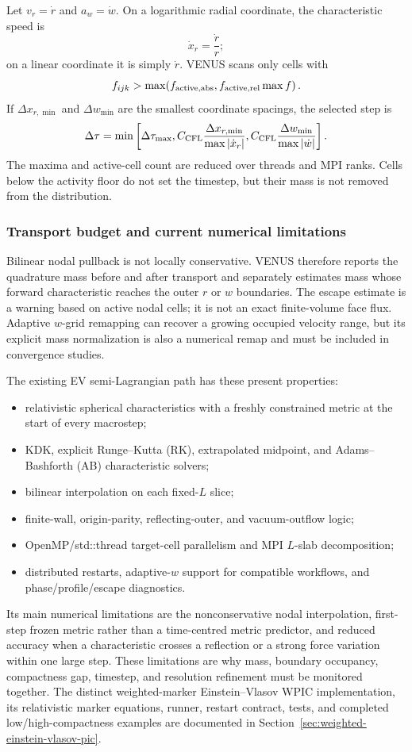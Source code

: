 \documentclass[11pt]{article}
\begin{document}
Let \(v_r=\dot r\) and \(a_w=\dot w\).  On a logarithmic radial coordinate,
the characteristic speed is
\[
 \dot x_r=\frac{\dot r}{r};
\]
on a linear coordinate it is simply \(\dot r\).  VENUS scans only cells with
\[
 f_{ijk}>
 \max\!\left(f_{\rm active,abs},
 f_{\rm active,rel}\max f\right).
\]
If \(\Delta x_{r,\min}\) and \(\Delta w_{\min}\) are the smallest coordinate
spacings, the selected step is
\[
 \Delta\tau=\min\left[
 \Delta\tau_{\max},
 C_{\rm CFL}\frac{\Delta x_{r,\min}}{\max|\dot x_r|},
 C_{\rm CFL}\frac{\Delta w_{\min}}{\max|\dot w|}
 \right].
\]
The maxima and active-cell count are reduced over threads and MPI ranks.
Cells below the activity floor do not set the timestep, but their mass is not
removed from the distribution.

\subsubsection{Transport budget and current numerical limitations}

Bilinear nodal pullback is not locally conservative.  VENUS therefore reports
the quadrature mass before and after transport and separately estimates mass
whose forward characteristic reaches the outer \(r\) or \(w\) boundaries.
The escape estimate is a warning based on active nodal cells; it is not an
exact finite-volume face flux.  Adaptive \(w\)-grid remapping can recover a
growing occupied velocity range, but its explicit mass normalization is also
a numerical remap and must be included in convergence studies.

The existing EV semi-Lagrangian path has these present properties:
\begin{itemize}
\item relativistic spherical characteristics with a freshly constrained metric
at the start of every macrostep;
\item KDK, explicit Runge--Kutta (RK), extrapolated midpoint, and
Adams--Bashforth (AB) characteristic solvers;
\item bilinear interpolation on each fixed-\(L\) slice;
\item finite-wall, origin-parity, reflecting-outer, and vacuum-outflow logic;
\item OpenMP/std::thread target-cell parallelism and MPI \(L\)-slab
decomposition;
\item distributed restarts, adaptive-\(w\) support for compatible workflows,
and phase/profile/escape diagnostics.
\end{itemize}
Its main numerical limitations are the nonconservative nodal interpolation,
first-step frozen metric rather than a time-centred metric predictor, and
reduced accuracy when a characteristic crosses a reflection or a strong
force variation within one large step.  These limitations are why mass,
boundary occupancy, compactness gap, timestep, and resolution refinement must
be monitored together.  The distinct weighted-marker Einstein--Vlasov WPIC
implementation, its relativistic marker equations, runner, restart contract,
tests, and completed low/high-compactness examples are documented in
Section~\ref{sec:weighted-einstein-vlasov-pic}.
\end{document}
